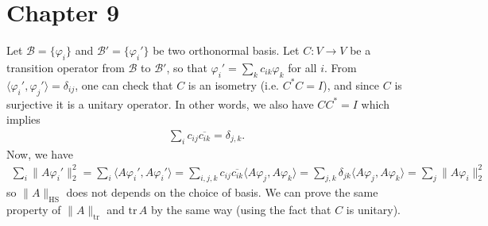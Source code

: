 \newpage
\section{Chapter 9}


\begin{problem}
Let $\mathcal{B} = \{\varphi_i\}$ and $\mathcal{B}' = \{ \varphi_i'\}$ be two orthonormal basis.
Let $C:V \to V$ be a transition operator from $\mathcal{B}$ to $\mathcal{B}'$, so that
$\varphi_{i}' = \sum_{k}c_{ik}\varphi_k$ for all $i$.
From $\langle \varphi_{i}', \varphi_{j}' \rangle = \delta_{ij}$, one can check that $C$ is an isometry (i.e. $C^{*}C = I$),
and since $C$ is surjective it is a unitary operator. 
In other words, we also have $CC^{*} = I$ which implies
\begin{align*}
    \sum_{i} c_{ij}\overline{c_{ik}} = \delta_{j, k}.
\end{align*}
Now, we have
\begin{align*}
    \sum_{i} \|A\varphi_{i}'\|^{2}_{2} = \sum_{i} \langle A\varphi_i', A\varphi_i' \rangle = \sum_{i, j, k}c_{ij}\overline{c_{ik}} \langle A\varphi_j, A\varphi_k \rangle = \sum_{j, k} \delta_{jk} \langle A\varphi_j, A\varphi_k \rangle = \sum_{j} \|A\varphi_i\|_{2}^{2}
\end{align*}
so $\| A\|_{\mathrm{HS}}$ does not depends on the choice of basis.
We can prove the same property of $\| A\|_{\mathrm{tr}}$ and $\mathrm{tr}\,A$ by the same way (using the fact that $C$ is unitary).


\end{problem}

\begin{problem} \notfinish
\end{problem}

\begin{problem} \notfinish
\end{problem}


\begin{problem} \notfinish
\end{problem}


\begin{problem} \notfinish
\end{problem}


\begin{problem} \notfinish
\end{problem}



\begin{problem} \notfinish
\end{problem}

\begin{problem} \notfinish
\end{problem}

\begin{problem} \notfinish
\end{problem}


\begin{problem} \notfinish
\end{problem}


\begin{problem} \notfinish
\end{problem}